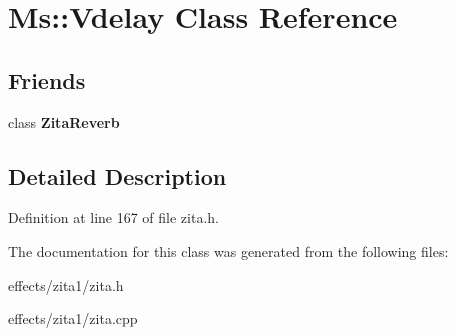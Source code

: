 \hypertarget{class_ms_1_1_vdelay}{}\section{Ms\+:\+:Vdelay Class Reference}
\label{class_ms_1_1_vdelay}
\subsection*{Friends}
\begin{DoxyCompactItemize}
\item 
\mbox{\label{class_ms_1_1_vdelay_a174ebfd5ad2853d19b5ec49485b195f0}} 
class {\bfseries Zita\+Reverb}
\end{DoxyCompactItemize}


\subsection{Detailed Description}


Definition at line 167 of file zita.\+h.



The documentation for this class was generated from the following files\+:\begin{DoxyCompactItemize}
\item 
effects/zita1/zita.\+h\item 
effects/zita1/zita.\+cpp\end{DoxyCompactItemize}
